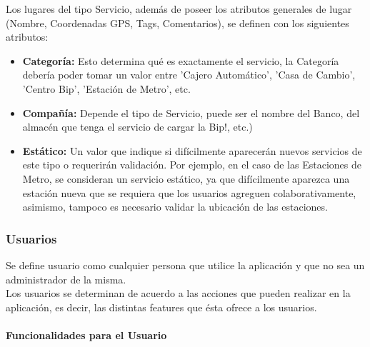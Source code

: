 \documentclass[10pt,letterpaper]{article}
\begin{document}
Los lugares del tipo Servicio, además de poseer los atributos generales de lugar (Nombre, Coordenadas GPS, Tags, Comentarios), se definen con los siguientes atributos:\\

\begin{itemize}
 \item \textbf{Categoría:} Esto determina qué es exactamente el servicio, la Categoría debería poder tomar un valor entre 'Cajero Automático', 'Casa de Cambio', 'Centro Bip', 'Estación de Metro', etc.\\

 \item \textbf{Compañía:} Depende el tipo de Servicio, puede ser el nombre del Banco, del almacén que tenga el servicio de cargar la Bip!, etc.)\\

 \item \textbf{Estático:} Un valor que indique si difícilmente aparecerán nuevos servicios de este tipo o requerirán validación. Por ejemplo, en el caso de las Estaciones de Metro, se consideran un servicio estático, ya que difícilmente aparezca una estación nueva que se requiera que los usuarios agreguen colaborativamente, asimismo, tampoco es necesario validar la ubicación de las estaciones.\\
\end{itemize}

\subsubsection{Usuarios}

Se define usuario como cualquier persona que utilice la aplicación y que no sea un administrador de la misma.\\

Los usuarios se determinan de acuerdo a las acciones que pueden realizar en la aplicación, es decir, las distintas features que ésta ofrece a los usuarios.\\

\paragraph{Funcionalidades para el Usuario}
\end{document}
